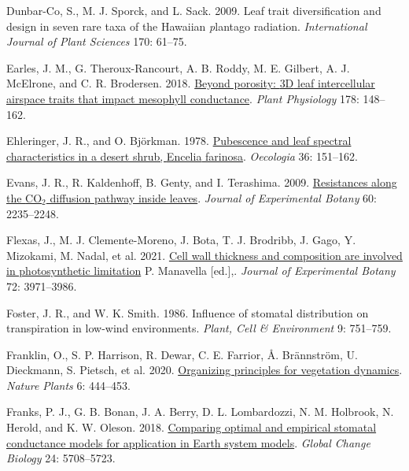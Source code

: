 \documentclass[
  letterpaper,
  DIV=11,
  numbers=noendperiod]{scrartcl}
\newlength{\cslhangindent}
\newlength{\cslentryspacingunit} %
\newenvironment{CSLReferences}[2] %
 {%
  \setlength{\parindent}{0pt}
  \ifodd #1
  \let\oldpar\par
  \def\par{\hangindent=\cslhangindent\oldpar}
  \fi
  \setlength{\parskip}{#2\cslentryspacingunit}
 }%
 {}
\begin{document}
\begin{CSLReferences}{1}{0}
\leavevmode{}%
Dunbar-Co, S., M. J. Sporck, and L. Sack. 2009. Leaf trait
diversification and design in seven rare taxa of the {Hawaiian}
\emph{p}lantago radiation. \emph{International Journal of Plant
Sciences} 170: 61--75.

\leavevmode{}%
Earles, J. M., G. Theroux-Rancourt, A. B. Roddy, M. E. Gilbert, A. J.
McElrone, and C. R. Brodersen. 2018.
\href{https://doi.org/10.1104/pp.18.00550}{Beyond porosity: {3D} leaf
intercellular airspace traits that impact mesophyll conductance}.
\emph{Plant Physiology} 178: 148--162.

\leavevmode{}%
Ehleringer, J. R., and O. Björkman. 1978.
\href{https://doi.org/10.1007/BF00349805}{Pubescence and leaf spectral
characteristics in a desert shrub, {Encelia} farinosa}. \emph{Oecologia}
36: 151--162.

\leavevmode{}%
Evans, J. R., R. Kaldenhoff, B. Genty, and I. Terashima. 2009.
\href{https://doi.org/10.1093/jxb/erp117}{Resistances along the
{CO}\(_{\textrm{2}}\) diffusion pathway inside leaves}. \emph{Journal of
Experimental Botany} 60: 2235--2248.

\leavevmode{}%
Flexas, J., M. J. Clemente-Moreno, J. Bota, T. J. Brodribb, J. Gago, Y.
Mizokami, M. Nadal, et al. 2021.
\href{https://doi.org/10.1093/jxb/erab144}{Cell wall thickness and
composition are involved in photosynthetic limitation} P. Manavella
{[}ed.{]},. \emph{Journal of Experimental Botany} 72: 3971--3986.

\leavevmode{}%
Foster, J. R., and W. K. Smith. 1986. Influence of stomatal distribution
on transpiration in low-wind environments. \emph{Plant, Cell \&
Environment} 9: 751--759.

\leavevmode{}%
Franklin, O., S. P. Harrison, R. Dewar, C. E. Farrior, Å. Brännström, U.
Dieckmann, S. Pietsch, et al. 2020.
\href{https://doi.org/10.1038/s41477-020-0655-x}{Organizing principles
for vegetation dynamics}. \emph{Nature Plants} 6: 444--453.

\leavevmode{}%
Franks, P. J., G. B. Bonan, J. A. Berry, D. L. Lombardozzi, N. M.
Holbrook, N. Herold, and K. W. Oleson. 2018.
\href{https://doi.org/10.1111/gcb.14445}{Comparing optimal and empirical
stomatal conductance models for application in {Earth} system models}.
\emph{Global Change Biology} 24: 5708--5723.


\end{CSLReferences}
\end{document}
